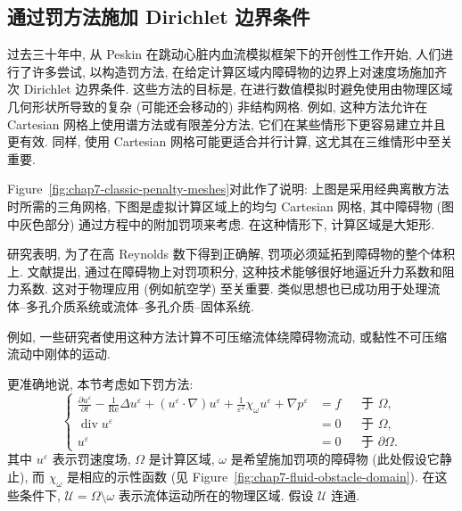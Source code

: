 \subsection{通过罚方法施加 Dirichlet 边界条件}
\label{sec:chap7-dirichlet-penalty}
\renewcommand{\thestatement}{2.\arabic{statement}}
\renewcommand{\theHstatement}{ch07.sec02.\arabic{statement}}
\setcounter{statement}{0}
\renewcommand{\thechaptersevensectiontworemark}{2.\arabic{chaptersevensectiontworemark}}
\begin{sloppypar}

过去三十年中, 从 Peskin 在跳动心脏内血流模拟框架下的开创性工作开始, 人们进行了许多尝试, 以构造罚方法, 在给定计算区域内障碍物的边界上对速度场施加齐次 Dirichlet 边界条件. 这些方法的目标是, 在进行数值模拟时避免使用由物理区域几何形状所导致的复杂 (可能还会移动的) 非结构网格. 例如, 这种方法允许在 Cartesian 网格上使用谱方法或有限差分方法, 它们在某些情形下更容易建立并且更有效. 同样, 使用 Cartesian 网格可能更适合并行计算, 这尤其在三维情形中至关重要.

Figure~\ref{fig:chap7-classic-penalty-meshes}对此作了说明: 上图是采用经典离散方法时所需的三角网格, 下图是虚拟计算区域上的均匀 Cartesian 网格, 其中障碍物 (图中灰色部分) 通过方程中的附加罚项来考虑. 在这种情形下, 计算区域是大矩形.

研究表明, 为了在高 Reynolds 数下得到正确解, 罚项必须延拓到障碍物的整个体积上. 文献提出, 通过在障碍物上对罚项积分, 这种技术能够很好地逼近升力系数和阻力系数. 这对于物理应用 (例如航空学) 至关重要. 类似思想也已成功用于处理流体--多孔介质系统或流体--多孔介质--固体系统.

例如, 一些研究者使用这种方法计算不可压缩流体绕障碍物流动, 或黏性不可压缩流动中刚体的运动.

更准确地说, 本节考虑如下罚方法:
\begin{equation}
\left\{
\begin{aligned}
 \frac{\partial u^\varepsilon}{\partial t}-\frac1{\operatorname{Re}}\Delta u^\varepsilon
 +(u^\varepsilon\cdot\nabla)u^\varepsilon
 +\frac1{\varepsilon^2}\chi_\omega u^\varepsilon+\nabla p^\varepsilon&=f
 &&\text{于 }\Omega,\\
 \operatorname{div}u^\varepsilon&=0&&\text{于 }\Omega,\\
 u^\varepsilon&=0&&\text{于 }\partial\Omega.
\end{aligned}
\right.
\label{eq:chap7-penalized-navier-stokes}
\end{equation}
其中 $u^\varepsilon$ 表示罚速度场, $\Omega$ 是计算区域, $\omega$ 是希望施加罚项的障碍物 (此处假设它静止), 而 $\chi_\omega$ 是相应的示性函数 (见 Figure~\ref{fig:chap7-fluid-obstacle-domain}). 在这些条件下, $\mathcal U=\Omega\setminus\omega$ 表示流体运动所在的物理区域. 假设 $\mathcal U$ 连通.


\end{sloppypar}
